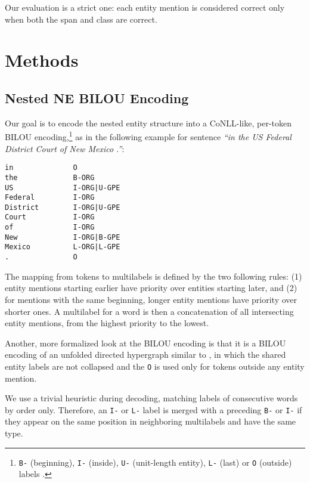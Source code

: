 \documentclass[11pt,a4paper]{article}
\begin{document}
Our evaluation is a strict one: each entity mention is considered correct only when both the span and class are correct.


\section{Methods}
\label{section:methods}

\subsection{Nested NE BILOU Encoding}
\label{section:linearization}

Our goal is to encode the nested entity structure into a CoNLL-like,
per-token BILOU encoding,\footnote{\texttt{B-} (beginning), \texttt{I-}
(inside), \texttt{U-} (unit-length entity), \texttt{L-} (last) or \texttt{O}
(outside) labels \cite{Ratinov2009}.} as in the following example for sentence
\textit{``in the US Federal District Court of New Mexico .''}:

\begin{small}
\begin{verbatim}
in              O
the             B-ORG
US              I-ORG|U-GPE
Federal         I-ORG
District        I-ORG|U-GPE
Court           I-ORG
of              I-ORG
New             I-ORG|B-GPE
Mexico          L-ORG|L-GPE
.               O
\end{verbatim}
\end{small}

The mapping from tokens to multilabels is defined by the two following rules:
(1) entity mentions starting earlier have priority over entities starting later, and
(2) for mentions with the same beginning, longer entity mentions have priority over shorter ones. A multilabel for a word is then a concatenation of all intersecting entity
mentions, from the highest priority to the lowest.



Another, more formalized look at the BILOU encoding is that it is a BILOU
encoding of an unfolded directed hypergraph similar to \citet{Katiyar2018}, in
which the shared entity labels are not collapsed and the \texttt{O} is used
only for tokens outside any entity mention.

We use a trivial heuristic during decoding, matching labels of consecutive words
by order only. Therefore, an \verb|I-| or \verb|L-| label is merged with a preceding
\verb|B-| or \verb|I-| if they appear on the same position in neighboring multilabels
and have the same type.
\end{document}
